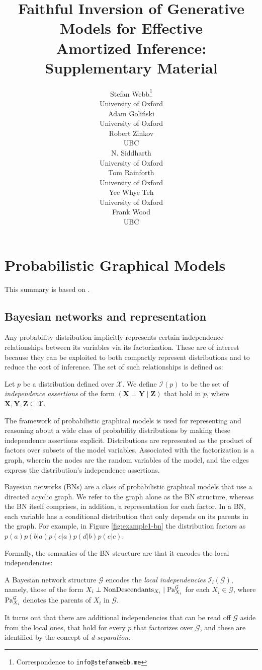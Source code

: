 \documentclass{article}
\title{Faithful Inversion of Generative Models for Effective \\ Amortized Inference: Supplementary Material}
\author{
  Stefan Webb\thanks{Correspondence to \texttt{info@stefanwebb.me}} \\
  University of Oxford \\
  \And
  Adam Goli\'{n}ski \\
  University of Oxford \\
  \And
  Robert Zinkov \\
  UBC \\
  \AND
  N. Siddharth \\
  University of Oxford \\
  \And
  Tom Rainforth \\
  University of Oxford \\
  \And
  Yee Whye Teh \\
  University of Oxford \\
  \And
  Frank Wood \\
  UBC \\
}
\begin{document}
\suppressfloats

\maketitle

\section{Probabilistic Graphical Models}
\label{sec:pgm-overflow}

This summary is based on \citet{KollerFriedman2009}.

\subsection{Bayesian networks and representation}\label{sec:bn-representation}
Any probability distribution implicitly represents certain independence relationships between its variables via its factorization.
These are of interest because they can be exploited to both compactly represent distributions and to reduce the cost of inference.
The set of such relationships is defined as:
\begin{definition}
	Let $p$ be a distribution defined over $\mathcal{X}$.
We define $\mathcal{I}(p)$ to be the set of \emph{independence assertions} of the form $(\mathbf{X}\perp\mathbf{Y}\mid\mathbf{Z})$ that hold in $p$, where $\mathbf{X},\mathbf{Y},\mathbf{Z}\subseteq\mathcal{X}$.
\end{definition}
The framework of probabilistic graphical models is used for representing and reasoning about a wide class of probability distributions by making these independence assertions explicit.
Distributions are represented as the product of factors over subsets of the model variables.
Associated with the factorization is a graph, wherein the nodes are the random variables of the model, and the edges express the distribution's independence assertions.

Bayesian networks (BNs) are a class of probabilistic graphical models that use a directed acyclic graph.
We refer to the graph alone as the BN structure, whereas the BN itself comprises, in addition, a representation for each factor.
In a BN, each variable has a conditional distribution that only depends on its parents in the graph.
For example, in Figure \ref{fig:example1-bn} the distribution factors as $p(a)p(b|a)p(c|a)p(d|b)p(e|c)$.

Formally, the semantics of the BN structure are that it encodes the local independencies:
\begin{definition}
	A Bayesian network structure $\mathcal{G}$ encodes the \emph{local independencies} $\mathcal{I}_l(\mathcal{G})$, namely, those of the form $X_i \perp \textnormal{NonDescendants}_{X_i}\mid\textnormal{Pa}^\mathcal{G}_{X_i}$ for each $X_i\in\mathcal{G}$, where $\textnormal{Pa}^\mathcal{G}_{X_i}$ denotes the parents of $X_i$ in $\mathcal{G}$.
\end{definition}
It turns out that there are additional independencies that can be read off $\mathcal{G}$ aside from the local ones, that hold for every $p$ that factorizes over $\mathcal{G}$, and these are identified by the concept of \emph{d-separation}.
\end{document}
